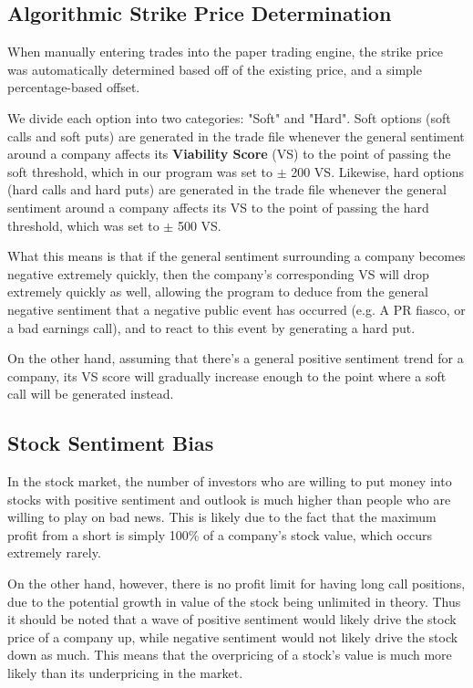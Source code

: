 \documentclass[11pt]{article}
\begin{document}
\subsection{Algorithmic Strike Price Determination}
When manually entering trades into the paper
trading engine, the strike price was automatically
determined based off of the existing price, and a
simple percentage-based offset.

We divide each option into two categories: "Soft"
and "Hard". Soft options (soft calls and soft puts)
are generated in the trade file whenever the general
sentiment around a company affects its {\bf Viability Score}
(VS) to the point of passing the soft threshold, which
in our program was set to $\pm$ 200 VS. Likewise, hard
options (hard calls and hard puts) are generated in the
trade file whenever the general sentiment around a company
affects its VS to the point of passing the hard threshold,
which was set to $\pm$ 500 VS.

What this means is that if the general sentiment
surrounding a company becomes negative extremely
quickly, then the company's corresponding VS will
drop extremely quickly as well, allowing the program
to deduce from the general negative sentiment that
a negative public event has occurred (e.g. A PR fiasco,
or a bad earnings call), and to react to this event by
generating a hard put.

On the other hand, assuming that there's a general
positive sentiment trend for a company, its VS score
will gradually increase enough to the point where a soft
call will be generated instead.

\subsection{Stock Sentiment Bias}
In the stock market, the number of investors
who are willing to put money into stocks with
positive sentiment and outlook is much higher
than people who are willing to play on bad news.
This is likely due to the fact that the maximum
profit from a short is simply 100\% of a company's
stock value, which occurs extremely rarely.

On the other hand, however, there is no profit limit
for having long call positions, due to the potential
growth in value of the stock being unlimited in theory.
Thus it should be noted that a wave of positive
sentiment would likely drive the stock price of a
company up, while negative sentiment would not likely
drive the stock down as much. This means that the
overpricing of a stock's value is much more likely
than its underpricing in the market.
\end{document}
